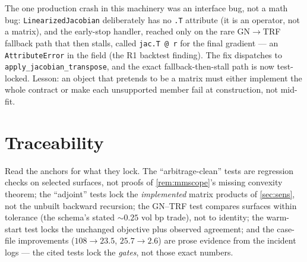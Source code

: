 \documentclass[11pt]{article}
\begin{document}
\begin{caution}[title={Caution (engineering): the field crash that
pretended to be a matrix}]
The one production crash in this machinery was an interface bug, not a math
bug: \texttt{LinearizedJacobian} deliberately has no \texttt{.T} attribute
(it is an operator, not a matrix), and the early-stop handler, reached only
on the rare GN$\to$TRF fallback path that then stalls, called
\texttt{jac.T @ r} for the final gradient --- an \texttt{AttributeError} in
the field (the R1 backtest finding).  The fix dispatches to
\texttt{apply\_jacobian\_transpose}, and the exact fallback-then-stall path
is now test-locked.  Lesson: an object that pretends to be a matrix must
either implement the whole contract or make each unsupported member fail at
construction, not mid-fit.
\end{caution}

\section{Traceability}
\label{sec:traceability}

Read the anchors for what they lock.  The ``arbitrage-clean'' tests are
regression checks on selected surfaces, not proofs of
\cref{rem:mmscope}'s missing convexity theorem; the ``adjoint'' tests lock
the \emph{implemented} matrix products of \cref{sec:sens}, not the unbuilt
backward recursion; the GN--TRF test compares surfaces within tolerance
(the schema's stated $\sim0.25$ vol bp trade), not to identity; the
warm-start test locks the unchanged objective plus observed agreement; and
the case-file improvements ($108\to23.5$, $25.7\to2.6$) are prose evidence
from the incident logs --- the cited tests lock the \emph{gates}, not those
exact numbers.
\end{document}
